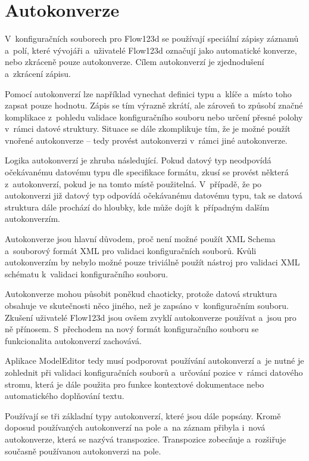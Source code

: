 \documentclass[FM,bw,DP]{tulthesis}
\begin{document}
\section{Autokonverze}
\label{sec:analyza-autokonverze}

V~konfiguračních souborech pro Flow123d se používají speciální zápisy záznamů a~polí, které vývojáři a~uživatelé Flow123d označují jako automatické konverze, nebo zkráceně pouze autokonverze. Cílem autokonverzí je zjednodušení a~zkrácení zápisu.

Pomocí autokonverzí lze například vynechat definici typu a~klíče a~místo toho zapsat pouze hodnotu. Zápis se tím výrazně zkrátí, ale zároveň to způsobí značné komplikace z~pohledu validace konfiguračního souboru nebo určení přesné polohy v~rámci datové struktury. Situace se dále zkomplikuje tím, že je možné použít vnořené autokonverze -- tedy provést autokonverzi v~rámci jiné autokonverze.

Logika autokonverzí je zhruba následující. Pokud datový typ neodpovídá o\-če\-ká\-va\-né\-mu datovému typu dle specifikace formátu, zkusí se provést některá z~autokonverzí, pokud je na tomto místě použitelná. V~případě, že po autokonverzi již datový typ odpovídá očekávanému datovému typu, tak se datová struktura dále prochází do hloubky, kde může dojít k~případným dalším autokonverzím.

Autokonverze jsou hlavní důvodem, proč není možné použít \gls{XML} Schema a~souborový formát \gls{XML} pro validaci konfiguračních souborů. Kvůli autokonverzím by nebylo možné pouze triviálně použít nástroj pro validaci \gls{XML} schématu k~validaci konfiguračního souboru.

Autokonverze mohou působit poněkud chaoticky, protože datová struktura obsahuje ve skutečnosti něco jiného, než je zapsáno v~konfiguračním souboru. Zkušení uživatelé Flow123d jsou ovšem zvyklí autokonverze používat a~jsou pro ně přínosem. S~přechodem na nový formát konfiguračního souboru se funkcionalita autokonverzí zachovává.

Aplikace ModelEditor tedy musí podporovat používání autokonverzí a~je nutné je zohlednit při validaci konfiguračních souborů a~určování pozice v~rámci datového stromu, která je dále použita pro funkce kontextové dokumentace nebo automatického doplňování textu. 

Používají se tři základní typy autokonverzí, které jsou dále popsány. Kromě doposud používaných autokonverzí na pole a~na záznam přibyla i~nová autokonverze, která se nazývá transpozice. Transpozice zobecňuje a~rozšiřuje současně používanou autokonverzi na pole.
\end{document}
